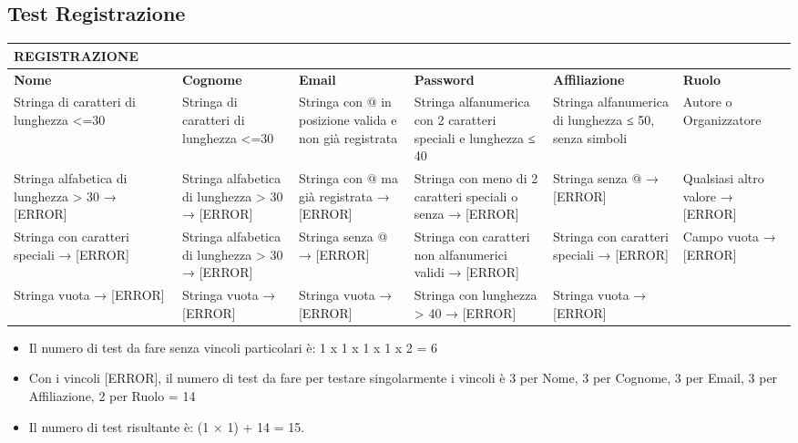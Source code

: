 \subsection{Test Registrazione}
\label{sec:test_registrazione}

\begin{sidewaystable}
\begin{tabular}{|p{3.5cm}|p{2cm}|p{2cm}|p{3cm}|p{1cm}|p{1cm}|}
\hline
\rowcolor{SkyBlue}
\textbf{REGISTRAZIONE} & & & & &\\
\hline
\rowcolor{Red}
\textbf{Nome} & \textbf{Cognome} & \textbf{Email} & \textbf{Password} & \textbf{Affiliazione} & \textbf{Ruolo}  \\
\hline
Stringa di caratteri di lunghezza <=30 & Stringa di caratteri di lunghezza <=30 & Stringa con @ in posizione valida e non già registrata & Stringa alfanumerica con 2 caratteri speciali e lunghezza ≤ 40 & Stringa alfanumerica di lunghezza ≤ 50, senza simboli & Autore o Organizzatore \\
\hline
Stringa alfabetica di lunghezza > 30 → [ERROR] & Stringa alfabetica di lunghezza > 30 → [ERROR] & Stringa con @ ma già registrata → [ERROR] & Stringa con meno di 2 caratteri speciali o senza → [ERROR] & Stringa senza @ → [ERROR] & Qualsiasi altro valore → [ERROR] \\
\hline
Stringa con caratteri speciali → [ERROR] & Stringa alfabetica di lunghezza > 30 → [ERROR] & Stringa senza @ → [ERROR] & Stringa con caratteri non alfanumerici validi → [ERROR] & Stringa con caratteri speciali → [ERROR] & Campo vuota → [ERROR]  \\
\hline
Stringa vuota → [ERROR] & Stringa vuota → [ERROR] & Stringa vuota → [ERROR] & Stringa con lunghezza > 40 → [ERROR] & Stringa vuota → [ERROR] &\\
\hline
\end{tabular}
\end{sidewaystable}

\begin{itemize}
\item Il numero di test da fare senza vincoli particolari è: 1 x 1 x 1 x 1 x 2 = 6
\item Con i vincoli [ERROR], il numero di test da fare per testare singolarmente i vincoli è 3 per Nome, 3 per Cognome, 3 per Email, 3 per Affiliazione, 2 per Ruolo = 14 
\item Il numero di test risultante è: (1 × 1) + 14 = 15.
\end{itemize}

